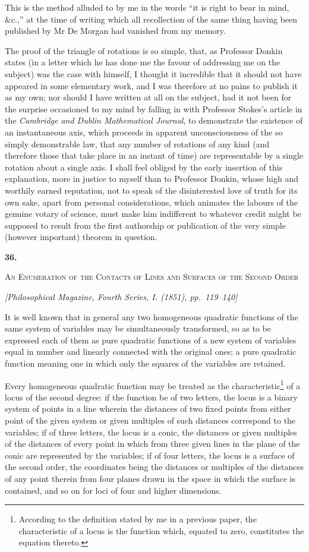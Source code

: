 \documentclass[11pt]{article}
\newcommand{\paperhead}[3]{%
  \clearpage
  \begin{center}
  {\Large\bfseries #1.}\par\vspace{0.85em}
  {\large\scshape #2}\par\vspace{0.6em}
  {\itshape [#3]}\par
  \end{center}\vspace{0.4em}}
\newcommand{\sourcepage}[1]{\marginpar{\scriptsize p.~#1}}
\begin{document}
{{This is the method alluded to by me in the words ``it is right to bear in mind, \&c.,'' at the time of writing which all recollection of the same thing having been published by Mr De Morgan had vanished from my memory.

The proof of the triangle of rotations is so simple, that, as Professor Donkin states (in a letter which he has done me the favour of addressing me on the subject) was the case with himself, I thought it incredible that it should not have appeared in some elementary work, and I was therefore at no pains to publish it as my own; nor should I have written at all on the subject, had it not been for the surprise occasioned to my mind by falling in with Professor Stokes's article in the \emph{Cambridge and Dublin Mathematical Journal}, to demonstrate the existence of an instantaneous axis, which proceeds in apparent unconsciousness of the so simply demonstrable law, that any number of rotations of any kind (and therefore those that take place in an instant of time) are representable by a single rotation about a single axis. I shall feel obliged by the early insertion of this explanation, more in justice to myself than to Professor Donkin, whose high and worthily earned reputation, not to speak of the disinterested love of truth for its own sake, apart from personal considerations, which animates the labours of the genuine votary of science, must make him indifferent to whatever credit might be supposed to result from the first authorship or publication of the very simple (however important) theorem in question.

\paperhead{36}{An Enumeration of the Contacts of Lines and Surfaces of the Second Order}{Philosophical Magazine, Fourth Series, I. (1851), pp.~119--140}

\sourcepage{219}
It is well known that in general any two homogeneous quadratic functions of the same system of variables may be simultaneously transformed, so as to be expressed each of them as pure quadratic functions of a new system of variables equal in number and linearly connected with the original ones; a pure quadratic function meaning one in which only the squares of the variables are retained.

Every homogeneous quadratic function may be treated as the characteristic\footnote{According to the definition stated by me in a previous paper, the characteristic of a locus is the function which, equated to zero, constitutes the equation thereto.} of a locus of the second degree: if the function be of two letters, the locus is a binary system of points in a line wherein the distances of two fixed points from either point of the given system or given multiples of such distances correspond to the variables; if of three letters, the locus is a conic, the distances or given multiples of the distances of every point in which from three given lines in the plane of the conic are represented by the variables; if of four letters, the locus is a surface of the second order, the coordinates being the distances or multiples of the distances of any point therein from four planes drawn in the space in which the surface is contained, and so on for loci of four and higher dimensions.

}}
\end{document}
